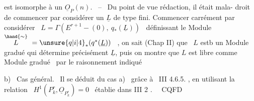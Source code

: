 
est isomorphe à un $\underline{O}_P(n)$. \ -- \ Du point de vue rédaction, il était mala-%
droit de commencer par considérer un $\underline{L}$ de type fini. Commencer carrément
par considérer \ $L = \Gamma(E^{r+1}-(0),\ q_*(\underline{L}))$ \ définissant le Module
$\overset{\hand{\sim}}{L} \ = \unsure{q|i|4}_*(q^*(\underline{L}))$ \ , on sait (Chap II) que \ $L$ estb un Module gradué qui
détermine précisément $\underline{L}$, puis on montre que $L$ est libre comme Module
gradué \ par le raisonnement indiqué

b) \ Cas général. \ Il se déduit du cas a) \ grâce à \ III 4.6.5. , en
utilisant la relation \ $H^1(P^r_k,\underline{O}_{P^r_k}) = 0$ \ établie dans III 2 . \ \ CQFD

